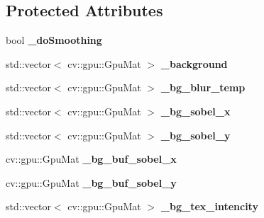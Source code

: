 \subsection*{Protected Attributes}
\begin{DoxyCompactItemize}
\item 
\hypertarget{classskl_1_1gpu_1_1_tex_cut_a8cfff71b4b342f808ec2bdb08938587c}{}\label{classskl_1_1gpu_1_1_tex_cut_a8cfff71b4b342f808ec2bdb08938587c} 
bool {\bfseries \+\_\+do\+Smoothing}
\item 
\hypertarget{classskl_1_1gpu_1_1_tex_cut_a14f856cabc0043857f11b47348b70610}{}\label{classskl_1_1gpu_1_1_tex_cut_a14f856cabc0043857f11b47348b70610} 
std\+::vector$<$ cv\+::gpu\+::\+Gpu\+Mat $>$ {\bfseries \+\_\+background}
\item 
\hypertarget{classskl_1_1gpu_1_1_tex_cut_afd8709d4020944511def0cffb595be71}{}\label{classskl_1_1gpu_1_1_tex_cut_afd8709d4020944511def0cffb595be71} 
std\+::vector$<$ cv\+::gpu\+::\+Gpu\+Mat $>$ {\bfseries \+\_\+bg\+\_\+blur\+\_\+temp}
\item 
\hypertarget{classskl_1_1gpu_1_1_tex_cut_a7a299cdf2a301a503839e0bced95f3e4}{}\label{classskl_1_1gpu_1_1_tex_cut_a7a299cdf2a301a503839e0bced95f3e4} 
std\+::vector$<$ cv\+::gpu\+::\+Gpu\+Mat $>$ {\bfseries \+\_\+bg\+\_\+sobel\+\_\+x}
\item 
\hypertarget{classskl_1_1gpu_1_1_tex_cut_a393b7f51df3f20d3cdcf53c6af3cc972}{}\label{classskl_1_1gpu_1_1_tex_cut_a393b7f51df3f20d3cdcf53c6af3cc972} 
std\+::vector$<$ cv\+::gpu\+::\+Gpu\+Mat $>$ {\bfseries \+\_\+bg\+\_\+sobel\+\_\+y}
\item 
\hypertarget{classskl_1_1gpu_1_1_tex_cut_aa6685ac7d607fb1cd97be316374a1e95}{}\label{classskl_1_1gpu_1_1_tex_cut_aa6685ac7d607fb1cd97be316374a1e95} 
cv\+::gpu\+::\+Gpu\+Mat {\bfseries \+\_\+bg\+\_\+buf\+\_\+sobel\+\_\+x}
\item 
\hypertarget{classskl_1_1gpu_1_1_tex_cut_a085ad3c00498843727e8742e16a668bb}{}\label{classskl_1_1gpu_1_1_tex_cut_a085ad3c00498843727e8742e16a668bb} 
cv\+::gpu\+::\+Gpu\+Mat {\bfseries \+\_\+bg\+\_\+buf\+\_\+sobel\+\_\+y}
\item 
\hypertarget{classskl_1_1gpu_1_1_tex_cut_a54f33c3c824d040d3c0cf706cbee7b5d}{}\label{classskl_1_1gpu_1_1_tex_cut_a54f33c3c824d040d3c0cf706cbee7b5d} 
std\+::vector$<$ cv\+::gpu\+::\+Gpu\+Mat $>$ {\bfseries \+\_\+bg\+\_\+tex\+\_\+intencity}
\item 
\hypertarget{classskl_1_1gpu_1_1_tex_cut_ad01e8a454af87f461621907622ae7c3c}{}\label{classskl_1_1gpu_1_1_tex_cut_ad01e8a454af87f461621907622ae7c3c} 

\end{DoxyCompactItemize}

